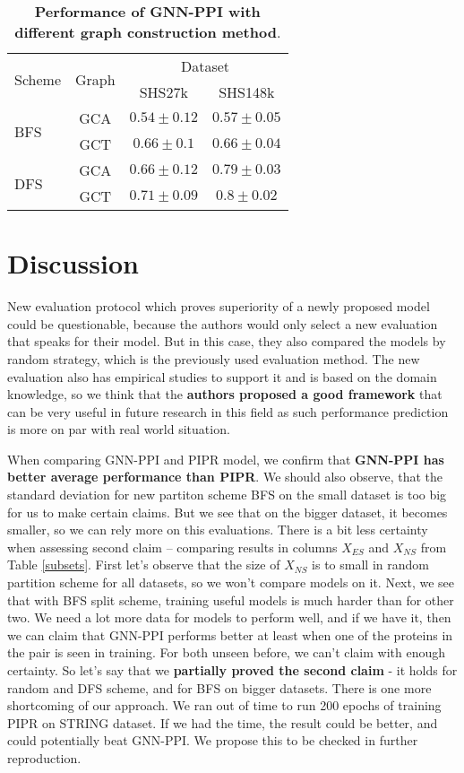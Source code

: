 \begin{table}[h] \centering
\caption{\label{graph} \textbf{Performance of GNN-PPI with different graph construction method}.}
\begin{tabular}{lccc}
\toprule
\multirow{2}{*}[-3pt]{Scheme} &    \multirow{2}{*}[-3pt]{Graph} &   \multicolumn{2}{c}{Dataset} \\
\cmidrule(l{6pt}r{6pt}){3-4}
    & &    SHS27k &       SHS148k \\
\midrule
\multirow{2}{*}{BFS} & GCA &  $0.54 \pm 0.12$ &  $0.57 \pm 0.05$ \\
& GCT &   $0.66 \pm 0.1$ &  $0.66 \pm 0.04$ \\
\midrule
\multirow{2}{*}{DFS} & GCA &  $0.66 \pm 0.12$ &  $0.79 \pm 0.03$ \\
& GCT &  $0.71 \pm 0.09$ &   $0.8 \pm 0.02$ \\
\bottomrule
\end{tabular}
\end{table}


\section{Discussion}

New evaluation protocol which proves superiority of a newly proposed model could be questionable, because the authors would only select a new evaluation that speaks for their model. But in this case, they also compared the models by random strategy, which is the previously used evaluation method. The new evaluation also has empirical studies to support it and is based on the domain knowledge, so we think that the \textbf{authors proposed a good framework} that can be very useful in future research in this field as such performance prediction is more on par with real world situation.

When comparing GNN-PPI and PIPR model, we confirm that \textbf{GNN-PPI has better average performance than PIPR}. We should also observe, that the standard deviation for new partiton scheme BFS on the small dataset is too big for us to make certain claims. But we see that on the bigger dataset, it becomes smaller, so we can rely more on this evaluations. 
There is a bit less certainty when assessing second claim -- comparing results in columns $X_{ES}$ and $X_{NS}$ from Table \ref{subsets}. First let's observe that the size of $X_{NS}$ is to small in random partition scheme for all datasets, so we won't compare models on it. Next, we see that with BFS split scheme, training useful models is much harder than for other two. We need a lot more data for models to perform well, and if we have it, then we can claim that GNN-PPI performs better at least when one of the proteins in the pair is seen in training. For both unseen before, we can't claim with enough certainty. So let's say that we \textbf{partially proved the second claim} - it holds for random and DFS scheme, and for BFS on bigger datasets.
There is one more shortcoming of our approach. We ran out of time to run 200 epochs of training PIPR on STRING dataset. If we had the time, the result could be better, and could potentially beat GNN-PPI. We propose this to be checked in further reproduction.

